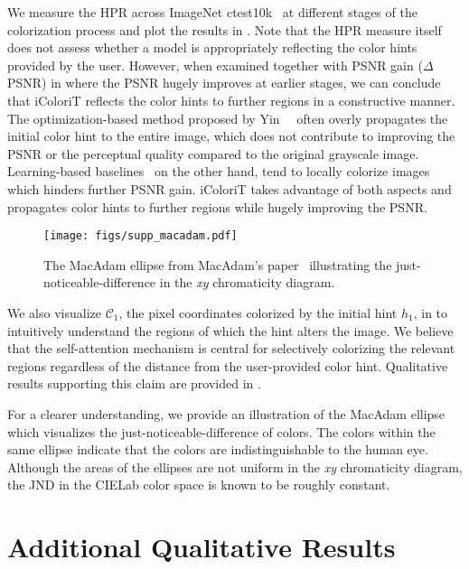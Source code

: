 \documentclass[10pt,twocolumn,letterpaper]{article}
\begin{document}
We measure the HPR across ImageNet ctest10k~\cite{ctest} at different stages of the colorization process and plot the results in . 
Note that the HPR measure itself does not assess whether a model is appropriately reflecting the color hints provided by the user. 
However, when examined together with PSNR gain ($\Delta$PSNR) in  where the PSNR hugely improves at earlier stages, we can conclude that iColoriT reflects the color hints to further regions in a constructive manner. 
The optimization-based method proposed by Yin~\etal~\cite{side} often overly propagates the initial color hint to the entire image, which does not contribute to improving the PSNR or the perceptual quality compared to the original grayscale image. 
Learning-based baselines~\cite{zhang2017, instanceaware} on the other hand, tend to locally colorize images which hinders further PSNR gain. 
iColoriT takes advantage of both aspects and propagates color hints to further regions while hugely improving the PSNR. 

 \begin{figure}[t]
\centering
    \texttt{[image: figs/supp\_macadam.pdf]}
\caption{The MacAdam ellipse from MacAdam's paper~\cite{macadam} illustrating the just-noticeable-difference in the \textit{xy} chromaticity diagram.}
    \vspace{-0.5cm}
 \end{figure}

We also visualize $\mathcal{C}_1$, the pixel coordinates colorized by the initial hint $h_1$, in  to intuitively understand the regions of which the hint alters the image. We believe that the self-attention mechanism is central for selectively colorizing the relevant regions regardless of the distance from the user-provided color hint. 
Qualitative results supporting this claim are provided in . 


For a clearer understanding, we provide an illustration of the MacAdam ellipse which visualizes the just-noticeable-difference of colors. 
The colors within the same ellipse indicate that the colors are indistinguishable to the human eye.
Although the areas of the ellipses are not uniform in the \textit{xy} chromaticity diagram, the JND in the CIELab color space is known to be roughly constant. 

\vspace{-0.2cm}
\section{Additional Qualitative Results}
\label{sec:sup_quali}
\end{document}
